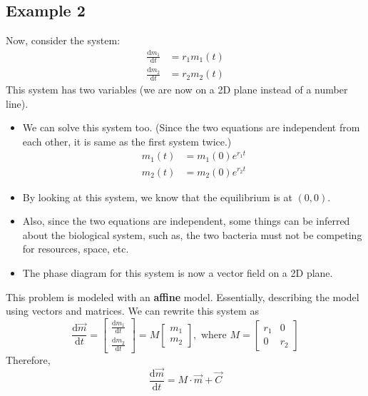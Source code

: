 \documentclass[10pt]{article}
\newcommand{\dd}{\text{d}}
\begin{document}
\subsection*{Example 2}
Now, consider the system:
\begin{align*}
    \frac{\dd m_1}{\dd t} &= r_1 m_1(t)\\
    \frac{\dd m_2}{\dd t} &= r_2 m_2(t)
\end{align*}
This system has two variables (we are now on a 2D plane instead of a number line).
\begin{itemize}
    \item We can solve this system too.  (Since the two equations are independent from each other, it is same as the first system twice.)
    \begin{align*}
        m_1(t) &= m_1(0) e^{r_1 t}\\
        m_2(t) &= m_2(0) e^{r_2 t}
    \end{align*}
	\item By looking at this system, we know that the equilibrium is at $(0, 0)$.
	\item Also, since the two equations are independent, some things can be inferred about the biological system, such as, the two bacteria must not be competing for resources, space, etc.
	\item The phase diagram for this system is now a vector field on a 2D plane.
\end{itemize}
This problem is modeled with an \textbf{affine} model.  Essentially, describing the model using vectors and matrices.  We can rewrite this system as
\[\frac{\dd \vec{m}}{\dd t} = \begin{bmatrix} \frac{\dd m_1}{\dd t} \\ \frac{\dd m_2}{\dd t}\end{bmatrix} = M \begin{bmatrix} m_1 \\ m_2 \end{bmatrix}, \text{ where } M = \begin{bmatrix} r_1 & 0 \\ 0 & r_2 \end{bmatrix}\]
Therefore,
\[\frac{\dd \vec{m}}{\dd t} = M \cdot \vec{m} + \vec{C}\]
\end{document}
